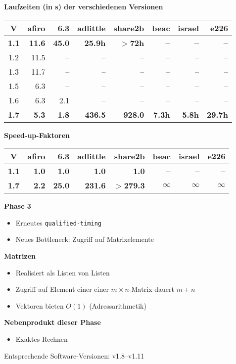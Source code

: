 \documentclass[slidesonly]{seminar}
\newcommand{\scaption}[1]{\centerline{\textbf{\large #1}}\medskip}
\newcommand{\header}[1]{\par\medskip\textbf{\large #1}\par}
\newcommand{\subheader}[1]{\par\textbf{#1}{}}
\begin{document}
%
\begin{slide}
\scaption{Laufzeiten (in s) der verschiedenen Versionen}
\begin{center}
\begin{small}
\begin{tabular}{crrrrrrr}
\hline
V  & afiro & 6.3 & adlittle & share2b & beac & israel & e226\\
\hline
\textbf{1.1} & \textbf{11.6} \textbf{} & \textbf{45.0}
\textbf{} &  \textbf{25.9h} \textbf{} &\textbf{$>$72h}
& \textbf{--} & \textbf{--} & \textbf{--} \\
1.2 & 11.5  & -- & -- & -- & -- & -- & -- \\
1.3 & 11.7  & -- & --  & -- & -- & -- & -- \\
1.5 & 6.3  & -- & -- & -- & -- & -- & -- \\
1.6 & 6.3  & 2.1  & -- & -- & -- & -- & --  \\
\textbf{1.7} & \textbf{5.3} \textbf{} & \textbf{1.8}
\textbf{} & \textbf{436.5} & \textbf{928.0} & \textbf{7.3h} &
\textbf{5.8h} & \textbf{29.7h}  \\
\hline
\end{tabular}
\end{small}
\end{center}
\header{Speed-up-Faktoren}
\begin{center}
\begin{small}
\begin{tabular}{crrrrrrr}
\hline
V  & afiro & 6.3 & adlittle & share2b & beac & israel & e226\\
\hline
\textbf{1.1} & \textbf{1.0} & \textbf{1.0}
&  \textbf{1.0} &\textbf{1.0}
& \textbf{--} & \textbf{--} & \textbf{--} \\
\textbf{1.7} & \textbf{2.2} & \textbf{25.0}
& \textbf{231.6} & \textbf{$>$279.3} & \textbf{$\infty$} &
\textbf{$\infty$} & \textbf{$\infty$}  \\
\hline
\end{tabular}
\end{small}
\end{center}
\end{slide}
%
\begin{slide}
\header{Phase 3}
\begin{itemize}
\item Erneutes \texttt{qualified-timing}
\item Neues Bottleneck: Zugriff auf Matrixelemente
\end{itemize}
\subheader{Matrizen}
\begin{itemize}
\item Realisiert als Listen von Listen
\item Zugriff auf Element einer einer $m\times n$-Matrix dauert $m+n$
\item Vektoren bieten $O(1)$ (Adressarithmetik)
\end{itemize}
\subheader{Nebenprodukt dieser Phase}
\begin{itemize}
\item Exaktes Rechnen
\end{itemize}
Entsprechende Software-Versionen: v1.8--v1.11
\end{slide}
\end{document}
